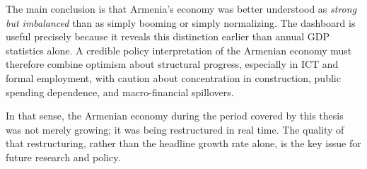 \documentclass[12pt,a4paper]{report}
\begin{document}
The main conclusion is that Armenia's economy was better understood as \textit{strong but imbalanced} than as simply booming or simply normalizing. The dashboard is useful precisely because it reveals this distinction earlier than annual GDP statistics alone. A credible policy interpretation of the Armenian economy must therefore combine optimism about structural progress, especially in ICT and formal employment, with caution about concentration in construction, public spending dependence, and macro-financial spillovers.

In that sense, the Armenian economy during the period covered by this thesis was not merely growing; it was being restructured in real time. The quality of that restructuring, rather than the headline growth rate alone, is the key issue for future research and policy.
\end{document}
